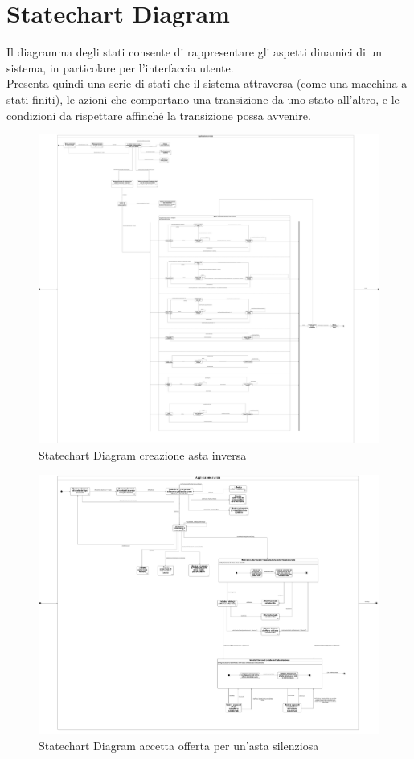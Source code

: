     \clearpage
    
    \section{Statechart Diagram}
        Il diagramma degli stati consente di rappresentare gli aspetti dinamici di un sistema, in particolare per l'interfaccia utente. \\
        Presenta quindi una serie di stati che il sistema attraversa (come una macchina a stati finiti), le azioni che comportano una transizione da uno stato all'altro, e le condizioni da rispettare affinché la transizione possa avvenire.

            \begin{figure}[htbp!]
            \centering
                \includegraphics[width=1\linewidth]{Immagini/Diagrammi/Statechart Diagram/CreaAstaInversa.pdf}
            \caption{Statechart Diagram creazione asta inversa}
            \end{figure}
            
            \begin{figure}[htbp!]
            \centering
                \includegraphics[width=1\linewidth]{Immagini/Diagrammi/Statechart Diagram/AccettaOffertaSilenziosa.pdf}
            \caption{Statechart Diagram accetta offerta per un'asta silenziosa}
            \end{figure}